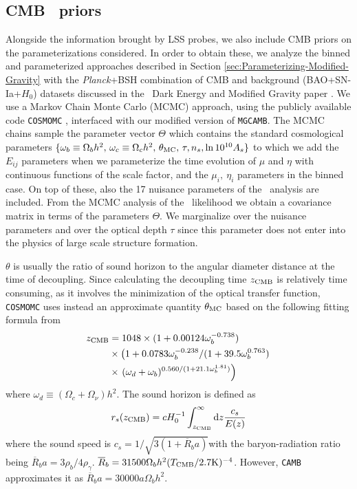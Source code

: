 \subsection{CMB \planck\ priors}
\label{sub:Fisher-Planck}
Alongside the information brought by LSS probes,
we also include CMB priors on the parameterizations considered. In
order to obtain these, we analyze the binned and parameterized approaches
described in Section \ref{sec:Parameterizing-Modified-Gravity} with
the {\it Planck}+BSH combination of CMB and background (BAO+SN-Ia+$H_{0}$)
datasets discussed in the \planck\ Dark Energy and Modified Gravity paper
\cite{planck_collaboration_planck_2016}.
We use a Markov Chain Monte Carlo (MCMC) approach, using the publicly
available code \texttt{COSMOMC} \cite{lewis_cosmological_2002,lewis_efficient_2013},
interfaced with our modified version of \texttt{MGCAMB}. The MCMC
chains sample the parameter vector $\Theta$ which contains the standard
cosmological parameters
$\{\omega_{b}\equiv\Omega_{b}h^{2},\,\omega_{c}\equiv\Omega_{c}h^{2},\,\theta_{\rm MC},\,\tau,n_{s},\ln{10^{10}A_{s}}\}$
to which we add the $E_{ij}$ parameters when we parameterize the time
evolution of $\mu$ and $\eta$ with continuous functions of the scale factor, 
and the $\mu_{i},\ \eta_{i}$ parameters in the binned
case. On top of these, also the 17 nuisance parameters of the \planck\
analysis are included. From the MCMC analysis of the \planck\ likelihood
we obtain a covariance matrix in terms of the parameters $\Theta$.
We marginalize over the nuisance parameters and over the optical
depth $\tau$ since this parameter does not enter into
the physics of large scale structure formation.

$\theta$ is usually the ratio of sound horizon
to the angular diameter distance at the time of decoupling. Since
calculating the decoupling time $z_{\rm CMB}$ is relatively time consuming,
as it involves the minimization of the optical transfer function,
\texttt{COSMOMC} uses instead an approximate quantity $\theta_{\rm MC}$
based on the following fitting formula from \cite{hu_small_1996}
\begin{align}
z_{\rm CMB} & =1048\times(1+0.00124\omega_{b}^{-0.738})\nonumber \\
&
\times\left(1+0.0783\omega_{b}^{-0.238}/(1+39.5\omega_{b}^{0.763})\right.\nonumber
\\
& \times\left.(\omega_{d}+\omega_{b})^{0.560/(1+21.1\omega_{b}^{1.81})}\right)
\end{align}
where $\omega_{d}\equiv(\Omega_{c}+\Omega_{\nu})h^{2}$.
The sound horizon is defined as 
\begin{equation}
r_{s}(z_{\rm CMB})=cH_{0}^{-1}\int_{z_{\rm CMB}}^{\infty}\mbox{d}z\frac{c_{s}}{E(z)}
\end{equation}
where the sound speed is $c_{s}=1/\sqrt{3(1+\overline{R}_{b}a)}$with
the baryon-radiation ratio being $\overline{R}_{b}a=3\rho_{b}/4\rho_{\gamma}$.
$\overline{R}_{b}=31500\Omega_{b}h^{2}(T_{\rm CMB}/2.7\mbox{K})^{-4}$.
However, \texttt{CAMB }approximates it as
$\overline{R}_{b}a=30000a\Omega_{b}h^{2}$.

